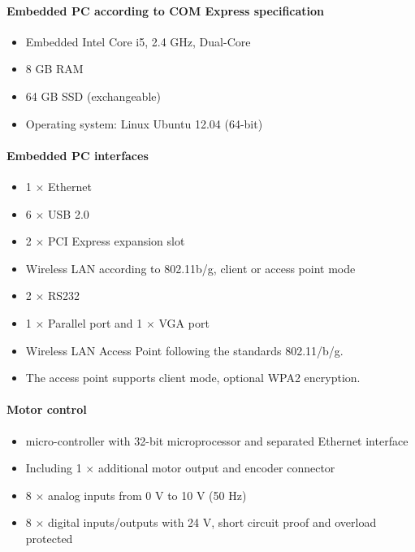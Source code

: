 \documentclass[12pt,twoside]{article}
\begin{document}
\begin{appendix}
\paragraph{Embedded PC according to COM Express specification}
\begin{itemize}
\item Embedded Intel Core i5, 2.4 GHz, Dual-Core
\item 8 GB RAM
\item 64 GB SSD (exchangeable)
\item Operating system: Linux Ubuntu 12.04 (64-bit)
\end{itemize}

\paragraph{Embedded PC interfaces}
\begin{itemize}
\item 1 $\times$ Ethernet
\item 6 $\times$ USB 2.0
\item 2 $\times$ PCI Express expansion slot
\item Wireless LAN according to 802.11b/g, client or access point mode
\item 2 $\times$  RS232
\item 1 $\times$ Parallel port and 1 $\times$ VGA port
\item Wireless LAN Access Point following the standards 802.11/b/g.
\item The access point supports client mode, optional WPA2 encryption.
\end{itemize}

\paragraph{Motor control}
\begin{itemize}
\item micro-controller with 32-bit microprocessor and separated
  Ethernet interface
\item Including 1 $\times$ additional motor output and encoder
  connector
\item 8 $\times$ analog inputs from 0 V to 10 V (50 Hz)
\item 8 $\times$ digital inputs/outputs with 24 V, short circuit proof
  and overload protected
\end{itemize}


\end{appendix}
\end{document}
